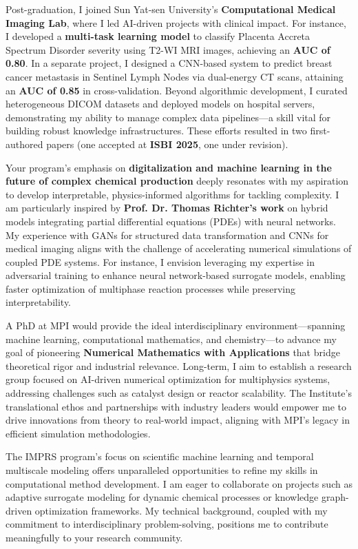 \documentclass[11pt,a4paper, final]{moderncv}
\begin{document}
Post-graduation, I joined Sun Yat-sen University's \textbf{Computational Medical Imaging Lab}, 
where I led AI-driven projects with clinical impact. 
For instance, I developed a \textbf{multi-task learning model} to 
classify Placenta Accreta Spectrum Disorder severity using T2-WI MRI images, achieving an \textbf{AUC of 0.80}. 
In a separate project, 
I designed a CNN-based system to predict breast cancer metastasis in Sentinel Lymph Nodes via dual-energy CT scans, 
attaining an \textbf{AUC of 0.85} in cross-validation. 
Beyond algorithmic development, I curated heterogeneous DICOM datasets and deployed models on hospital servers, 
demonstrating my ability to manage complex data pipelines—a skill vital for building robust knowledge infrastructures. 
These efforts resulted in two first-authored papers (one accepted at \textbf{ISBI 2025}, one under revision).

Your program's emphasis on \textbf{digitalization and machine learning in the future of complex chemical production} 
deeply resonates with my aspiration to develop interpretable, physics-informed algorithms for tackling complexity. 
I am particularly inspired by \textbf{Prof. Dr. Thomas Richter's work} 
on hybrid models integrating partial differential equations (PDEs) with neural networks. 
My experience with GANs for structured data transformation and CNNs for medical imaging aligns with the challenge of accelerating numerical simulations of coupled PDE systems. 
For instance, I envision leveraging my expertise in adversarial training to enhance neural network-based surrogate models, 
enabling faster optimization of multiphase reaction processes while preserving interpretability.

A PhD at MPI would provide the ideal interdisciplinary environment—spanning machine learning, computational mathematics, 
and chemistry—to advance my goal of pioneering \textbf{Numerical Mathematics with Applications} 
that bridge theoretical rigor and industrial relevance. 
Long-term, I aim to establish a research group focused on 
AI-driven numerical optimization for multiphysics systems, 
addressing challenges such as catalyst design or reactor scalability. 
The Institute's translational ethos and partnerships with industry leaders would empower me to drive innovations from theory to real-world impact, aligning with MPI's legacy in efficient simulation methodologies.

The IMPRS program's focus on scientific machine learning and temporal multiscale modeling offers unparalleled opportunities to refine my skills in computational method development. 
I am eager to collaborate on projects such as adaptive surrogate modeling for dynamic chemical processes or knowledge graph-driven optimization frameworks. 
My technical background, coupled with my commitment to interdisciplinary problem-solving, positions me to contribute meaningfully to your research community.
\end{document}
